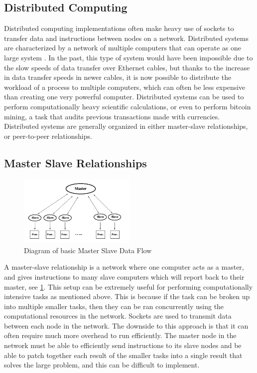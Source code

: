 \documentclass[conference, 12pt]{IEEEtran}
\begin{document}
\subsection{Distributed Computing}
Distributed computing implementations often make heavy use of sockets to transfer data and instructions between nodes on a network. Distributed systems are characterized by a network of multiple computers that can operate as one large system \cite{lin1995distributed}. In the past, this type of system would have been impossible due to the slow speeds of data transfer over Ethernet cables, but thanks to the increase in data transfer speeds in newer cables, it is now possible to distribute the workload of a process to multiple computers, which can often be less expensive than creating one very powerful computer. Distributed systems can be used to perform computationally heavy scientific calculations, or even to perform bitcoin mining, a task that audits previous transactions made with currencies. Distributed systems are generally organized in either master-slave relationships, or peer-to-peer relationships.

\subsection{Master Slave Relationships}
\begin{figure}[H]
    \centering
    \centerline{\includegraphics[width=0.5\textwidth]{Figure1.png}}
    \caption{Diagram of basic Master Slave Data Flow \cite{ramaekers}}
    \label{Figure1}
\end{figure}

A master-slave relationship is a network where one computer acts as a master, and gives instructions to many slave computers which will report back to their master, see \ref{Figure1}. This setup can be extremely useful for performing computationally intensive tasks as mentioned above. This is because if the task can be broken up into multiple smaller tasks, then they can be ran concurrently using the computational resources in the network. Sockets are used to transmit data between each node in the network. The downside to this approach is that it can often require much more overhead to run efficiently. The master node in the network must be able to efficiently send instructions to its slave nodes and be able to patch together each result of the smaller tasks into a single result that solves the large problem, and this can be difficult to implement.
\end{document}
